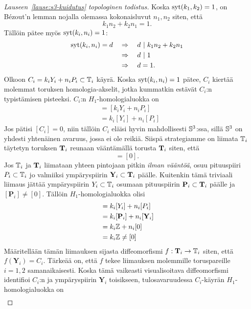 \begin{proof}[Lauseen~\ref{lause:s3-kuidutus} topologinen todistus]
    Koska $\syt(k_1,k_2)=1$, on Bézout'n lemman nojalla olemassa kokonaisluvut $n_1,n_2$ siten, että
    \begin{equation*}
        k_1n_2+k_2n_1=1.
    \end{equation*}
    Tällöin pätee myös $\syt(k_i,n_i)=1$:
    \begin{align*}
        \syt(k_i,n_i)=d\quad&\Rightarrow\quad d\ |\ k_1n_2+k_2n_1 \\
        &\Rightarrow\quad d\ |\ 1 \\
        &\Rightarrow\quad d=1.
    \end{align*}
    Olkoon $C_i=k_iY_i+n_iP_i\subset\T_i$ käyrä. Koska $\syt(k_i,n_i)=1$ pätee, $C_i$ kiertää molemmat toruksen homologia-akselit, jotka kummatkin estävät $C_i$:n typistämisen pisteeksi. $C_i$:n $H_1$-homologialuokka on
    \begin{align*}
        [C_i]&=[k_iY_i+n_iP_i] \\
        &=k_i[Y_i]+n_i[P_i]
    \end{align*}
    Jos pätisi $[C_i]=0$, niin tällöin $C_i$ eläisi hyvin mahdollisesti $\S^3$:ssa, sillä $\S^3$ on yhdesti yhtenäinen avaruus, jossa ei ole reikiä. Siispä strategiamme on liimata $\T_i$ täytetyn toruksen $\TT_i$ reunaan vääntämällä torusta $\TT_i$ siten, että
    \begin{equation*}
        [k_iY_i+n_iP_i]=[0].
    \end{equation*}
    Jos $\T_i$ ja $\TT_i$ liimataan yhteen pintojaan pitkin \emph{ilman vääntöä}, osuu pituuspiiri $P_i\subset\T_i$ jo valmiiksi ympäryspiirin $\mathbf{Y}_i\subset\TT_i$ päälle. Kuitenkin tämä triviaali liimaus jättää ympäryspiirin $Y_i\subset\T_i$ osumaan pituuspiirin $\mathbf{P}_i\subset\TT_i$ päälle ja $[\mathbf{P}_i]\ne[0]$. Tällöin $H_1$-homologialuokka olisi
    \begin{align*}
        [C_i]&=k_i[Y_i]+n_i[P_i] \\
        &=k_i[\mathbf{P}_i]+n_i[\mathbf{Y}_i] \\
        &=k_i\Z+n_i[0] \\
        &=k_i\Z\ne[0]
    \end{align*}
    Määritellään tämän liimauksen sijasta diffeomorfismi $f:\TT_i\to\T_i$ siten, että $f(\mathbf{Y}_i)=C_i$. Tärkeää on, että $f$ tekee liimauksen molemmille toruspareille $i=1,2$ samanaikaisesti. Koska tämä vaikeasti visualisoitava diffeomorfismi identifioi $C_i$:n ja ympäryspiirin $\mathbf{Y}_i$ toisikseen, tulosavaruudessa $C_i$-käyrän $H_1$-homologialuokka on
    \begin{align*}

\end{align*}
\end{proof}
